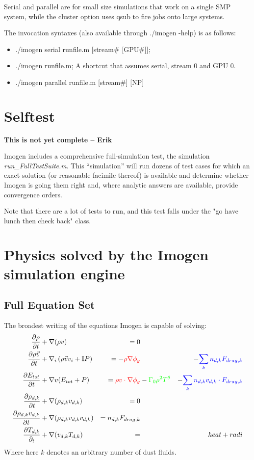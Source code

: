 \documentclass[letterpaper,12pt]{article}
\begin{document}
Serial and parallel are for small size simulations that work on a single SMP system,
while the cluster option uses qsub to fire jobs onto large systems.

The invocation syntaxes (also available through ./imogen -help) is as follows:
\begin{itemize}
\item ./imogen serial runfile.m [stream\# [GPU\#]];
\item ./imogen runfile.m; A shortcut that assumes serial, stream 0 and GPU 0.
\item ./imogen parallel runfile.m [stream\#] [NP]
\end{itemize}

\section{Selftest}

\textbf{This is not yet complete -- Erik}

Imogen includes a comprehensive full-simulation test, the simulation
\textit{run\_FullTestSuite.m}. This ``simulation'' will run dozens of test cases
for which an exact solution (or reasonable facimile thereof) is available
and determine whether Imogen is going them right and, where analytic answers
are available, provide convergence orders.

Note that there are a lot of tests to run, and this test falls under the "go have
lunch then check back" class.

\section{Physics solved by the Imogen simulation engine}

\subsection{Full Equation Set}

The broadest writing of the equations Imogen is capable of solving:
\begin{align*}
\frac{\partial \rho}{\partial t} &+ \nabla (\rho v) &= 0 & & \\
\frac{\partial \rho \vec{v}}{\partial t} &+ \nabla_i \left( \rho \vec{v} v_i + \mathbb{I} P \right) &= 
- \textcolor{red}{\rho \nabla \phi_g } & & - 
\textcolor{blue}{ \sum_k n_{d,k} F_{drag,k}  }\\
\frac{\partial E_{tot}}{\partial t} &+ \nabla v (E_{tot} + P) &= 
\textcolor{red}{\rho v \cdot \nabla \phi_g} & 
- \textcolor{green}{\Gamma_0 \rho^2 T^\theta } &
- \textcolor{blue}{\sum_k n_{d,k} v_{d,k} \cdot F_{drag,k}} \\
\frac{\partial \rho_{d,k}}{\partial t} &+ \nabla (\rho_{d,k} v_{d,k}) &= 0 & & \\
\frac{\partial \rho_{d,k} v_{d,k}}{\partial t} &+ \nabla (\rho_{d,k} v_{d,k} v_{d,k}) &= n_{d,k} F_{drag,k}  & & \\
\frac{\partial T_{d,k}}{\partial_t} &+ \nabla (v_{d,k} T_{d,k} ) &= & & heat+radi
\end{align*}
Where here $k$ denotes an arbitrary number of dust fluids.
\end{document}
